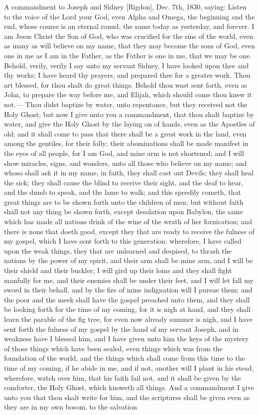 		A commandment to Joseph and Sidney [Rigdon], Dec. 7th, 1830, saying: Listen to the voice of the Lord your God, even Alpha and Omega, the beginning and the end, whose course is an eternal round, the same today as yesterday, and forever. I am Jesus Christ the Son of God, who was crucified for the sins of the world, even as many as will believe on my name, that they may become the sons of God, even one in me as I am in the Father, as the Father is one in me, that we may be one. Behold, verily, verily I say unto my servant Sidney, I have looked upon thee and thy works; I have heard thy prayers, and prepared thee for a greater work. Thou art blessed, for thou shalt do great things. Behold thou wast sent forth, even as John, to prepare the way before me, and Elijah, which should come thou knew it not.--- Thou didst baptize by water, unto repentance, but they received not the Holy Ghost; but now I give unto you a commandment, that thou shalt baptize by water, and give the Holy Ghost by the laying on of hands, even as the Apostles of old; and it shall come to pass that there shall be a great work in the land, even among the gentiles, for their folly; their abominations shall be made manifest in the eyes of all people, for I am God, and mine arm is not shortened; and I will show miracles, signs, and wonders, unto all those who believe on my name; and whoso shall ask it in my name, in faith, they shall cast out Devils; they shall heal the sick; they shall cause the blind to receive their sight, and the deaf to hear, and the dumb to speak, and the lame to walk; and this speedily cometh, that great things are to be shown forth unto the children of men; but without faith shall not any thing be shown forth, except desolation upon Babylon, the same which has made all nations drink of the wine of the wrath of her fornication; and there is none that doeth good, except they that are ready to receive the fulness of my gospel, which I have sent forth to this generation; wherefore, I have called upon the weak things, they that are unlearned and despised, to thrash the nations by the power of my spirit, and their arm shall be mine arm, and I will be their shield and their buckler; I will gird up their loins and they shall fight manfully for me, and their enemies shall be under their feet, and I will let fall my sword in their behalf, and by the fire of mine indignation will I pursue them; and the poor and the meek shall have the gospel preached unto them, and they shall be looking forth for the time of my coming, for it is nigh at hand, and they shall learn the parable of the fig tree, for even now already summer is nigh, and I have sent forth the fulness of my gospel by the hand of my servant Joseph, and in weakness have I blessed him, and I have given unto him the keys of the mystery of those things which have been sealed, even things which was from the foundation of the world, and the things which shall come from this time to the time of my coming, if he abide in me, and if not, another will I plant in his stead, wherefore, watch over him, that his faith fail not, and it shall be given by the comforter, the Holy Ghost, which knoweth all things. And a commandment I give unto you that thou shalt write for him, and the scriptures shall be given even as they are in my own bosom, to the salvation 